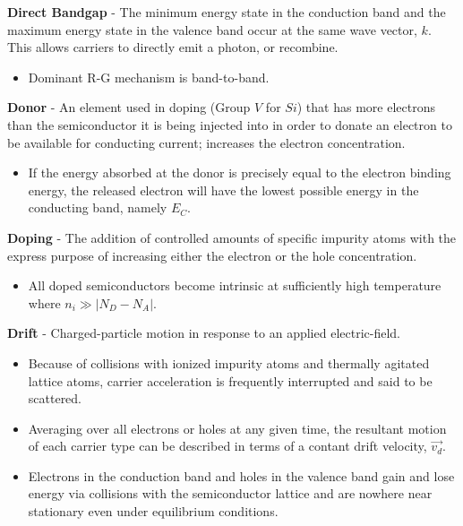 \vspace{0.5cm}
\noindent
    \textbf{Direct Bandgap} - The minimum energy state in the conduction band and the maximum energy state in the valence band occur at the same wave vector, $k$.  This allows carriers to directly emit a photon, or recombine.
    \vspace{0.15cm}
    \begin{itemize}
        \setlength\itemsep{0.5em}
        \item{Dominant R-G mechanism is band-to-band.}
    \end{itemize}
\vspace{0.5cm}
    \textbf{Donor} - An element used in doping (Group $V$ for $Si$) that has more electrons than the semiconductor it is being injected into in order to donate an electron to be available for conducting current; increases the electron concentration.
    \vspace{0.15cm}
    \begin{itemize}
        \setlength\itemsep{0.5em}
        \item{If the energy absorbed at the donor is precisely equal to the electron binding energy, the released electron will have the lowest possible energy in the conducting band, namely $E_C$.}
    \end{itemize}
\vspace{0.5cm}
    \textbf{Doping} - The addition of controlled amounts of specific impurity atoms with the express purpose of increasing either the electron or the hole concentration.
    \vspace{0.15cm}
    \begin{itemize}
        \setlength\itemsep{0.5em}
        \item{All doped semiconductors become intrinsic at sufficiently high temperature where $n_i \gg \lvert N_D - N_A \rvert$.}
    \end{itemize}
\vspace{0.5cm}
    \textbf{Drift} - Charged-particle motion in response to an applied electric-field.
    \vspace{0.15cm}
    \begin{itemize}
        \setlength\itemsep{0.5em}
        \item{Because of collisions with ionized impurity atoms and thermally agitated lattice atoms, carrier acceleration is frequently interrupted and said to be scattered.}
        \item{Averaging over all electrons or holes at any given time, the resultant motion of each carrier type can be described in terms of a contant drift velocity, $\vec{v_d}$.}
        \item{Electrons in the conduction band and holes in the valence band gain and lose energy via collisions with the semiconductor lattice and are nowhere near stationary even under equilibrium conditions.}
    \end{itemize}
